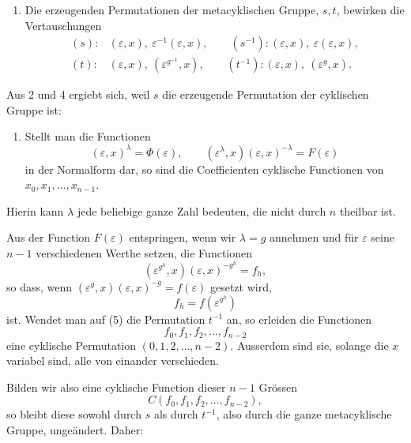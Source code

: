 \documentclass[11pt]{article}
\begin{document}
\begin{enumerate}[resume,label=\arabic*.]
\item Die erzeugenden Permutationen der metacyklischen Gruppe, $s,t$, bewirken die Vertauschungen
\[
\begin{array}{ll}
(s):&(\varepsilon,x),\ \varepsilon^{-1}(\varepsilon,x),\qquad
(s^{-1}): (\varepsilon,x),\ \varepsilon(\varepsilon,x),\\[2mm]
(t):&(\varepsilon,x),\ (\varepsilon^{g^{-1}},x),\qquad
(t^{-1}): (\varepsilon,x),\ (\varepsilon^{g},x).
\end{array}
\]
\end{enumerate}

Aus 2 und 4 ergiebt sich, weil $s$ die erzeugende Permutation der cyklischen Gruppe ist:

\begin{enumerate}[resume,label=\arabic*.]
\item Stellt man die Functionen
\begin{equation}\tag{4}
  (\varepsilon,x)^\lambda=\Phi(\varepsilon),\qquad
  (\varepsilon^\lambda,x)(\varepsilon,x)^{-\lambda}=F(\varepsilon)
\end{equation}
in der Normalform dar, so sind die Coefficienten cyklische Functionen von $x_0,x_1,\ldots,x_{n-1}$.
\end{enumerate}
Hierin kann $\lambda$ jede beliebige ganze Zahl bedeuten, die nicht durch $n$ theilbar ist.

Aus der Function $F(\varepsilon)$ entspringen, wenn wir $\lambda=g$ annehmen und f\"ur $\varepsilon$ seine $n-1$ verschiedenen Werthe setzen, die Functionen
\begin{equation}\tag{5}
  (\varepsilon^{g^h},x)(\varepsilon,x)^{-g^h}=f_h,
\end{equation}
so dass, wenn $(\varepsilon^g,x)(\varepsilon,x)^{-g}=f(\varepsilon)$ gesetzt wird,
\begin{equation}\tag{6}
  f_h=f(\varepsilon^{g^h})
\end{equation}
ist. Wendet man auf (5) die Permutation $t^{-1}$ an, so erleiden die Functionen
\[
  f_0,f_1,f_2,\ldots,f_{n-2}
\]
eine cyklische Permutation $(0,1,2,\ldots,n-2)$. Ausserdem sind sie, solange die $x$ variabel sind, alle von einander verschieden.

Bilden wir also eine cyklische Function dieser $n-1$ Gr\"ossen
\begin{equation}\tag{7}
  C(f_0,f_1,f_2,\ldots,f_{n-2}),
\end{equation}
so bleibt diese sowohl durch $s$ als durch $t^{-1}$, also durch die ganze metacyklische Gruppe, unge\"andert. Daher:
\end{document}
